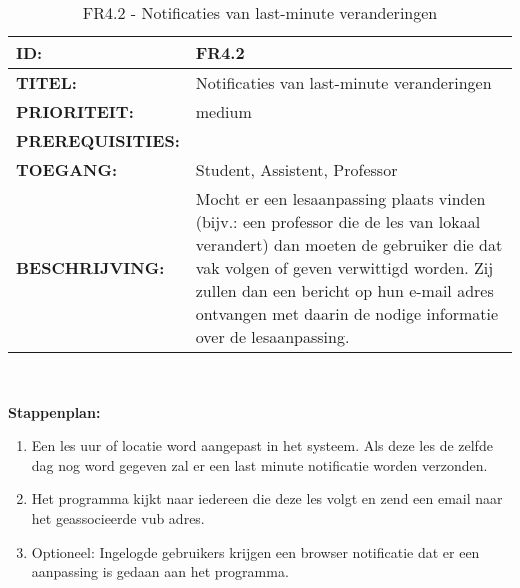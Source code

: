 \noindent\begin{table}[H]
            \begin{tabular}{l | p{10cm}}
                \textbf{ID:} & FR4.2 \\ \hline
                \textbf{TITEL:} & Notificaties van last-minute veranderingen \\ \hline
                \textbf{PRIORITEIT:} &  medium \\ \hline
                \textbf{PREREQUISITIES:} & \\ \hline
                \textbf{TOEGANG:} & Student, Assistent, Professor \\ \hline
                \textbf{BESCHRIJVING:} & Mocht er een lesaanpassing plaats vinden (bijv.: een professor die de les van lokaal verandert) dan moeten de gebruiker die dat vak volgen of geven verwittigd worden. Zij zullen dan een bericht op hun e-mail adres ontvangen met daarin de nodige informatie over de lesaanpassing.\\
            \end{tabular}\\
            \caption{FR4.2 - Notificaties van last-minute veranderingen}
			\label{tab:FR4.2 - Notificaties van last-minute veranderingen}
        \end{table}      
        
\textbf{Stappenplan:}
	\begin{enumerate}
	\item Een les uur of locatie word aangepast in het systeem. Als deze les de zelfde dag nog word gegeven zal er een last minute notificatie worden verzonden.
	\item Het programma kijkt naar iedereen die deze les volgt en zend een email naar het geassocieerde vub adres.
	\item Optioneel: Ingelogde gebruikers krijgen een browser notificatie dat er een aanpassing is gedaan aan het programma.  
	\end{enumerate}

